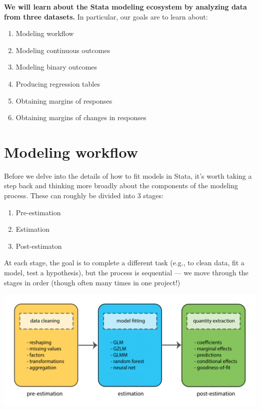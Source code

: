 \documentclass[
]{book}
\providecommand{\tightlist}{%
  \setlength{\itemsep}{0pt}\setlength{\parskip}{0pt}}
\begin{document}
\begin{alert}

\textbf{We will learn about the Stata modeling ecosystem by analyzing data from three datasets.} In particular, our goals are to learn about:

\begin{enumerate}
\def\labelenumi{\arabic{enumi}.}
\tightlist
\item
  Modeling workflow
\item
  Modeling continuous outcomes\\
\item
  Modeling binary outcomes
\item
  Producing regression tables
\item
  Obtaining margins of responses
\item
  Obtaining margins of changes in responses
\end{enumerate}

\end{alert}

\hypertarget{modeling-workflow-1}{%
\section{Modeling workflow}\label{modeling-workflow-1}}

Before we delve into the details of how to fit models in Stata, it's worth taking a step back and thinking more broadly about the components of the modeling process. These can roughly be divided into 3 stages:

\begin{enumerate}
\def\labelenumi{\arabic{enumi}.}
\tightlist
\item
  Pre-estimation
\item
  Estimation
\item
  Post-estimaton
\end{enumerate}

At each stage, the goal is to complete a different task (e.g., to clean data, fit a model, test a hypothesis),
but the process is sequential --- we move through the stages in order (though often many times in one project!)

\includegraphics{Stata/StataMod/images/Stata_model_pipeline.png}
\end{document}
